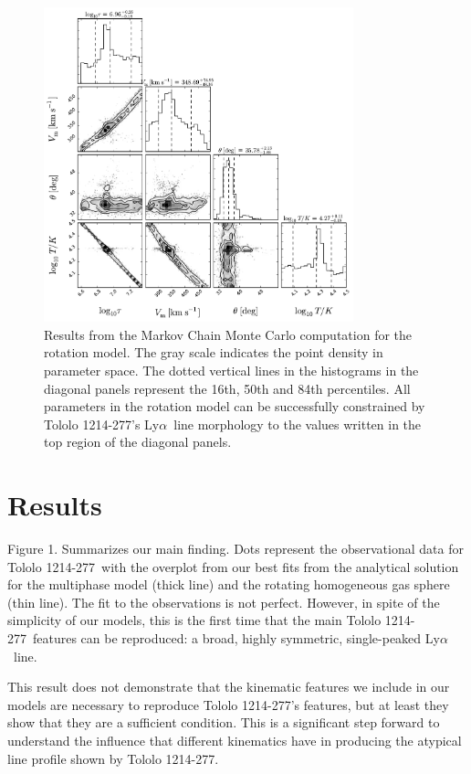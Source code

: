 \documentclass[a4,useAMS,usenatbib,usegraphicx]{mn2e}
\newcommand{\tol}{Tololo 1214-277}
\newcommand{\lya}{\ifmmode{{\rm Ly}\alpha}\else Ly$\alpha$\ \fi}
\begin{document}
\begin{figure}
\begin{center}
\includegraphics[width=0.8\textwidth]{emcee_results.pdf}
\caption{Results from the Markov Chain Monte Carlo computation for
    the rotation model. 
    The gray scale indicates the point density in parameter space. 
    The dotted vertical lines in the histograms in the diagonal panels
    represent the 16th, 50th and 84th percentiles. 
    All parameters in the rotation model can be successfully constrained by \tol's
    \lya line morphology to the values written in the top region of
    the diagonal panels.
    \label{emceeresults}} 
\end{center}
\end{figure}


\section{Results}


Figure 1. Summarizes our main finding.
Dots represent the observational data for \tol\ with the
overplot from our best fits from the analytical solution for the
multiphase model (thick line)  and the rotating homogeneous gas sphere
(thin line). 
The fit to the observations is not perfect. 
However, in spite of the
simplicity of our models, this is the first time that the main
\tol\ features can be reproduced: a broad, highly symmetric,
single-peaked \lya line. 

This result does not demonstrate that the kinematic features we
include in our models are necessary to reproduce \tol's features, but
at least they show that they are a sufficient condition.
This is a significant step forward to understand the influence that
different kinematics have in producing the atypical line profile shown
by \tol.
\end{document}

